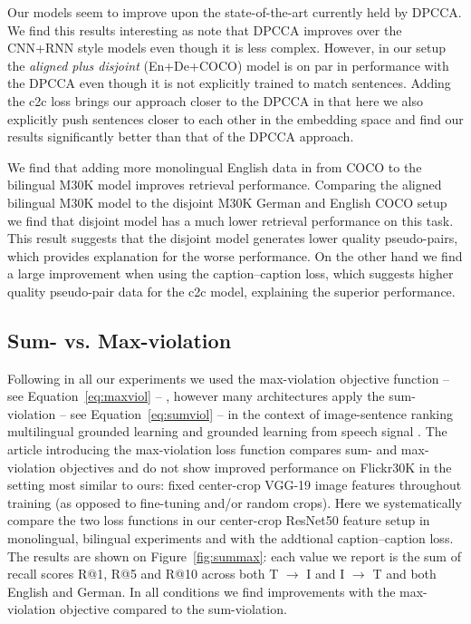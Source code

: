 Our models seem to improve upon the state-of-the-art currently
held by DPCCA.  We find this results interesting as 
\cite{rajendran2015bridge} note that DPCCA improves over the
CNN+RNN style models even though it is less complex. However,
in our setup the \emph{aligned plus disjoint} (En+De+COCO) model
is on par in performance with the DPCCA even though it is not 
explicitly trained to match sentences.
Adding the c2c loss brings our approach closer to the 
DPCCA in that here we also explicitly push sentences closer 
to each other in the embedding space and find our results
significantly better than that of the
DPCCA approach. 

We find that adding more monolingual English data
in from COCO to the bilingual M30K model improves retrieval
performance. Comparing the aligned bilingual M30K model to the disjoint M30K German and 
English COCO setup we find that disjoint model has a much lower retrieval performance on
this task. This result suggests that the disjoint model generates lower quality pseudo-pairs,
which provides explanation for the worse performance. On the other hand we find a large  
improvement when using the caption--caption loss, which suggests higher quality pseudo-pair 
data for the c2c model, explaining the superior performance.

\subsection{Sum- vs. Max-violation}


Following \cite{kadar2018conll} in all our experiments we used the max-violation 
objective function -- see Equation~\ref{eq:maxviol} -- , however many architectures apply
the sum-violation -- see Equation~\ref{eq:sumviol} --  in the context of image-sentence 
ranking \cite{nam2017dual} multilingual grounded learning \cite{D17-1303} and 
grounded learning from speech signal \cite{chrupala2017representations}. The article
introducing the max-violation loss function \cite{faghri2017vse++} compares sum- and 
max-violation objectives and do not show improved performance on Flickr30K 
in the setting most similar to
ours: fixed center-crop VGG-19 image features throughout training (as opposed to fine-tuning 
and/or random crops). Here we systematically compare the two loss functions 
in our center-crop 
ResNet50 feature setup in monolingual, bilingual experiments and with the addtional 
caption--caption loss.  The results are shown on Figure~\ref{fig:summax}: each 
value we report is the sum of recall scores R@1, R@5 and R@10
across both T $\rightarrow$ I and I $\rightarrow$ T and both
English and German.
In all conditions we find improvements with the max-violation objective
compared to the sum-violation.

